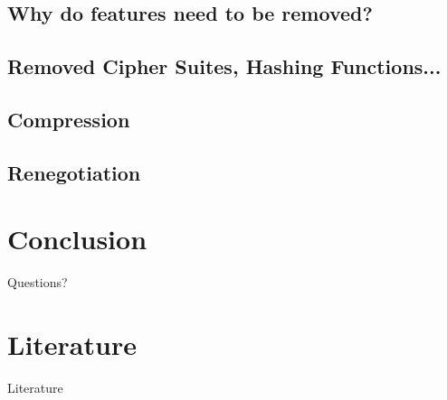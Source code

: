 \documentclass{f4_beamer_metropolis}
\begin{document}
\subsection{Why do features need to be removed?}

\begin{frame}

\end{frame}

\subsection{Removed Cipher Suites, Hashing Functions...}

\begin{frame}

\end{frame}

\subsection{Compression}

\begin{frame}

\end{frame}

\subsection{Renegotiation}

\begin{frame}

\end{frame}

\section{Conclusion}

\begin{frame}

\end{frame}

\begin{frame}[standout]
  Questions?
\end{frame}

\section{Literature}

\begin{frame}[allowframebreaks]{Literature}
  \printbibliography
\end{frame}
\end{document}
